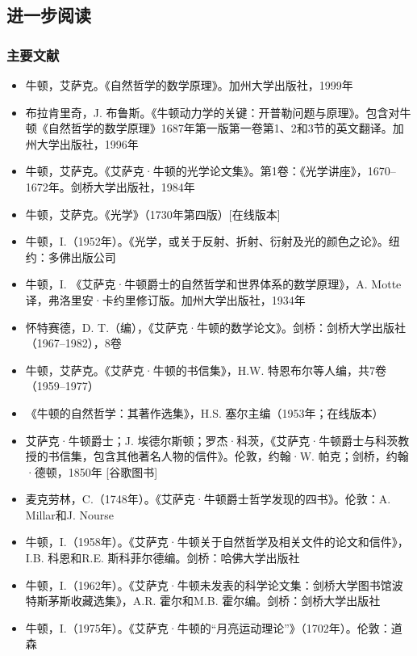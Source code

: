 \subsection{进一步阅读}
\subsubsection{主要文献}
\begin{itemize}
\item 牛顿，艾萨克。《自然哲学的数学原理》。加州大学出版社，1999年
  \item 布拉肯里奇，J. 布鲁斯。《牛顿动力学的关键：开普勒问题与原理》。包含对牛顿《自然哲学的数学原理》1687年第一版第一卷第1、2和3节的英文翻译。加州大学出版社，1996年
\item 牛顿，艾萨克。《艾萨克·牛顿的光学论文集》。第1卷：《光学讲座》，1670–1672年。剑桥大学出版社，1984年
\item 牛顿，艾萨克。《光学》（1730年第四版）[在线版本]
  \item 牛顿，I.（1952年）。《光学，或关于反射、折射、衍射及光的颜色之论》。纽约：多佛出版公司
\item 牛顿，I. 《艾萨克·牛顿爵士的自然哲学和世界体系的数学原理》，A. Motte译，弗洛里安·卡约里修订版。加州大学出版社，1934年
\item 怀特赛德，D. T.（编），《艾萨克·牛顿的数学论文》。剑桥：剑桥大学出版社（1967–1982），8卷
\item  牛顿，艾萨克。《艾萨克·牛顿的书信集》，H.W. 特恩布尔等人编，共7卷（1959–1977）
\item 《牛顿的自然哲学：其著作选集》，H.S. 塞尔主编（1953年；在线版本）
\item 艾萨克·牛顿爵士；J. 埃德尔斯顿；罗杰·科茨，《艾萨克·牛顿爵士与科茨教授的书信集，包含其他著名人物的信件》。伦敦，约翰·W. 帕克；剑桥，约翰·德顿，1850年 [谷歌图书]
\item  麦克劳林，C.（1748年）。《艾萨克·牛顿爵士哲学发现的四书》。伦敦：A. Millar和J. Nourse
\item 牛顿，I.（1958年）。《艾萨克·牛顿关于自然哲学及相关文件的论文和信件》，I.B. 科恩和R.E. 斯科菲尔德编。剑桥：哈佛大学出版社
\item 牛顿，I.（1962年）。《艾萨克·牛顿未发表的科学论文集：剑桥大学图书馆波特斯茅斯收藏选集》，A.R. 霍尔和M.B. 霍尔编。剑桥：剑桥大学出版社
\item  牛顿，I.（1975年）。《艾萨克·牛顿的“月亮运动理论”》（1702年）。伦敦：道森
\end{itemize}
